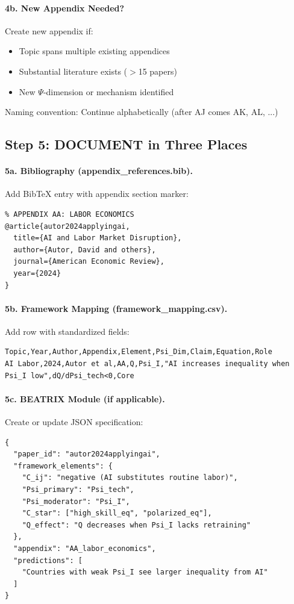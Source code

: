 \paragraph{4b. New Appendix Needed?}
Create new appendix if:
\begin{itemize}
  \item Topic spans multiple existing appendices
  \item Substantial literature exists ($>$15 papers)
  \item New $\Psi$-dimension or mechanism identified
\end{itemize}

Naming convention: Continue alphabetically (after AJ comes AK, AL, ...)

\subsection{Step 5: DOCUMENT in Three Places}

\paragraph{5a. Bibliography (appendix\_references.bib).}
Add BibTeX entry with appendix section marker:

\begin{verbatim}
% APPENDIX AA: LABOR ECONOMICS
@article{autor2024applyingai,
  title={AI and Labor Market Disruption},
  author={Autor, David and others},
  journal={American Economic Review},
  year={2024}
}
\end{verbatim}

\paragraph{5b. Framework Mapping (framework\_mapping.csv).}
Add row with standardized fields:

\begin{verbatim}
Topic,Year,Author,Appendix,Element,Psi_Dim,Claim,Equation,Role
AI Labor,2024,Autor et al,AA,Q,Psi_I,"AI increases inequality when Psi_I low",dQ/dPsi_tech<0,Core
\end{verbatim}

\paragraph{5c. BEATRIX Module (if applicable).}
Create or update JSON specification:

\begin{verbatim}
{
  "paper_id": "autor2024applyingai",
  "framework_elements": {
    "C_ij": "negative (AI substitutes routine labor)",
    "Psi_primary": "Psi_tech",
    "Psi_moderator": "Psi_I",
    "C_star": ["high_skill_eq", "polarized_eq"],
    "Q_effect": "Q decreases when Psi_I lacks retraining"
  },
  "appendix": "AA_labor_economics",
  "predictions": [
    "Countries with weak Psi_I see larger inequality from AI"
  ]
}
\end{verbatim}

